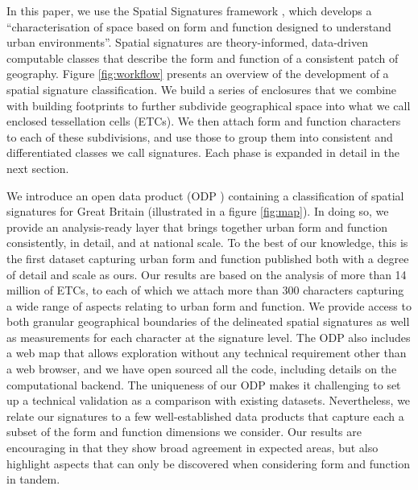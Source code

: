 \documentclass[fleqn,10pt]{wlscirep}
\begin{document}
In this paper, we use the Spatial Signatures framework \cite{dab_mf_2021a, dab_mf_2021b},
which develops a ``characterisation of space based on form and function
designed to understand urban environments''\cite{dab_mf_2021a}.
Spatial signatures are theory-informed, data-driven computable classes that
describe the form and function of a consistent patch of geography.
%
Figure \ref{fig:workflow} presents an overview of the development of a spatial
signature classification.
%
We build a series of enclosures that we combine with building footprints
to further subdivide geographical space into what we call enclosed tessellation cells (ETCs). We then attach form and function
characters to each of these subdivisions, and use those to group them into
consistent and differentiated classes we call signatures.
%
Each phase is expanded in detail in the next section.

We introduce an open data product (ODP \cite{odp_paper21}) containing a classification of
spatial signatures for Great Britain (illustrated in a figure \ref{fig:map}). In doing so, we provide an
analysis-ready layer that brings together urban form and function consistently, in
detail, and at national scale. To the best of our knowledge, this is the first
dataset capturing urban form and function published both with a degree of detail and scale as
ours.
Our results are based on the analysis of more than 14 million of ETCs, to
each of which we attach more than 300 characters capturing a wide range of
aspects relating to urban form and function.
We provide access to both granular geographical boundaries of the delineated spatial signatures
as well as measurements for each character at the signature level.
The ODP also includes a web map that allows exploration without any technical
requirement other than a web browser, and we have open sourced all the code,
including details on the computational backend.
The uniqueness of our ODP makes it challenging to set up a technical validation as a
comparison with existing datasets. Nevertheless, we relate our
signatures to a few well-established data products that capture each a subset
of the form and function dimensions we consider. Our results are encouraging
in that they show broad agreement in expected areas, but also highlight
aspects that can only be discovered when considering form and function in tandem.
\end{document}
